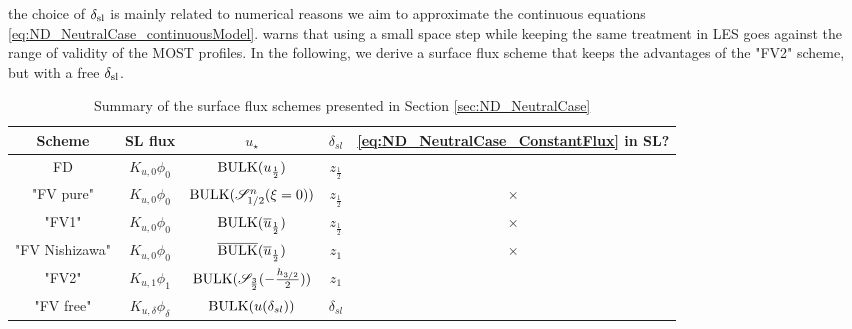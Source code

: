 the choice of $\delta_{\rm sl}$ is mainly related to numerical
reasons we aim to approximate the continuous equations
\eqref{eq:ND_NeutralCase_continuousModel}.
\cite{basu_cautionary_2017} warns that using a small space step
while keeping the same treatment in LES goes against the
range of validity of the MOST profiles.
In the following, we derive a surface flux scheme that keeps
the advantages of the "FV2" scheme, but with a free $\delta_{\rm sl}$.
%
\begin{table}
	\centering
\begin{tabular}{c|c|c|c|c}
	Scheme & SL flux & $u_\star$ & $\delta_{sl}$ 
		& \eqref{eq:ND_NeutralCase_ConstantFlux} in SL? \\
		\hline
		FD & $K_{u,0} \phi_0$ & ${\rm BULK}(u_{\frac{1}{2}})$
			& $z_{\frac{1}{2}}$ & \checkmark \\
		"FV pure" & $K_{u,0} \phi_0$ &
			${\rm BULK}({\cal S}_{1/2}^{n}(\xi=0))$
			& $z_{\frac{1}{2}}$ & $\times$ \\
		"FV1" & $K_{u,0} \phi_0$ &
			${\rm BULK}(\overline{u}_{\frac{1}{2}})$
			& $z_{\frac{1}{2}}$ & $\times$ \\
		"FV Nishizawa" & $K_{u,0} \phi_0$ &
			$\overline{\rm BULK}
				(\overline{u}_{\frac{1}{2}})$
			& $z_1$ & $\times$ \\
		"FV2" & $K_{u,1} \phi_1$ &
			${\rm BULK} ({\cal S}_{\frac{3}{2}}(
				  -\frac{h_{3/2}}{2}))$
			& $z_1$ & \checkmark \\
		"FV free" & $K_{u,\delta} \phi_{\delta}$ &
			${\rm BULK}
				(u(\delta_{sl}))$
			& $\delta_{sl}$ & \checkmark \\
	\end{tabular}
	\caption{Summary of the surface flux schemes presented in
	Section \ref{sec:ND_NeutralCase}}
	\label{tab:ND_NeutralCase_summary_sfscheme}
\end{table}
